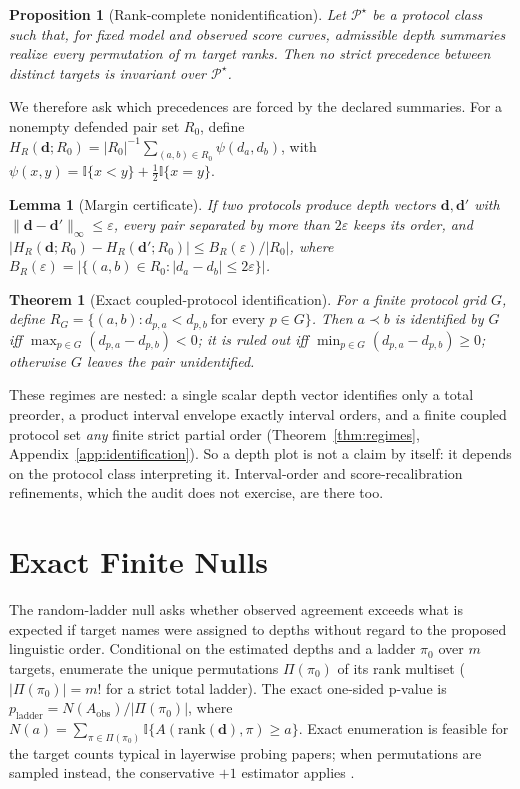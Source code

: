 \documentclass[11pt]{article}
\newtheorem{theorem}{Theorem}
\newtheorem{proposition}{Proposition}
\newtheorem{lemma}{Lemma}
\begin{document}
\begin{proposition}[Rank-complete nonidentification]
\label{prop:nonid}
Let $\mathcal{P}^\star$ be a protocol class such that, for fixed model and observed score curves, admissible depth summaries realize every permutation of $m$ target ranks. Then no strict precedence between distinct targets is invariant over $\mathcal{P}^\star$.
\end{proposition}

We therefore ask which precedences are forced by the declared summaries. For a nonempty defended pair set $R_0$, define $H_R(\mathbf{d};R_0)=|R_0|^{-1}\sum_{(a,b)\in R_0}\psi(d_a,d_b)$, with $\psi(x,y)=\mathbb{I}\{x<y\}+\tfrac12\mathbb{I}\{x=y\}$.

\begin{lemma}[Margin certificate]
\label{lem:margin}
If two protocols produce depth vectors $\mathbf{d},\mathbf{d}'$ with $\|\mathbf{d}-\mathbf{d}'\|_\infty\le\varepsilon$, every pair separated by more than $2\varepsilon$ keeps its order, and $|H_R(\mathbf{d};R_0)-H_R(\mathbf{d}';R_0)|\le B_R(\varepsilon)/|R_0|$, where $B_R(\varepsilon)=|\{(a,b)\in R_0:|d_a-d_b|\le 2\varepsilon\}|$.
\end{lemma}

\begin{theorem}[Exact coupled-protocol identification]
\label{thm:coupled}
For a finite protocol grid $G$, define $R_G=\{(a,b): d_{p,a}<d_{p,b}\ \text{for every } p\in G\}$. Then $a\prec b$ is identified by $G$ iff $\max_{p\in G}(d_{p,a}-d_{p,b})<0$; it is ruled out iff $\min_{p\in G}(d_{p,a}-d_{p,b})\ge 0$; otherwise $G$ leaves the pair unidentified.
\end{theorem}

These regimes are nested: a single scalar depth vector identifies only a total preorder, a product interval envelope exactly interval orders, and a finite coupled protocol set \emph{any} finite strict partial order (Theorem~\ref{thm:regimes}, Appendix~\ref{app:identification}). So a depth plot is not a claim by itself: it depends on the protocol class interpreting it. Interval-order and score-recalibration refinements, which the audit does not exercise, are there too.

\section{Exact Finite Nulls}
\label{sec:nulls}

The random-ladder null asks whether observed agreement exceeds what is expected if target names were assigned to depths without regard to the proposed linguistic order. Conditional on the estimated depths and a ladder $\pi_0$ over $m$ targets, enumerate the unique permutations $\Pi(\pi_0)$ of its rank multiset ($|\Pi(\pi_0)|=m!$ for a strict total ladder). The exact one-sided p-value is $p_{\mathrm{ladder}}=N(A_{\mathrm{obs}})/|\Pi(\pi_0)|$, where $N(a)=\sum_{\pi\in\Pi(\pi_0)}\mathbb{I}\{A(\mathrm{rank}(\mathbf{d}),\pi)\ge a\}$. Exact enumeration is feasible for the target counts typical in layerwise probing papers; when permutations are sampled instead, the conservative $+1$ estimator applies \citep{phipsonsmyth2010permutation}.
\end{document}
